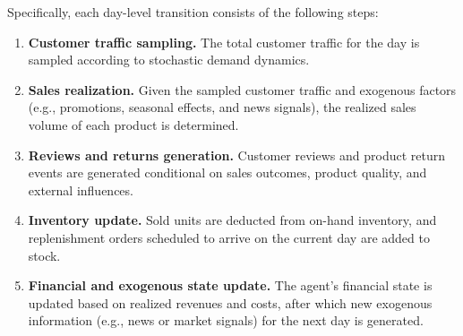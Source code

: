 Specifically, each day-level transition consists of the following steps:
\begin{enumerate}[leftmargin=*]
    \item \textbf{Customer traffic sampling.}  
    The total customer traffic for the day is sampled according to stochastic demand dynamics.
    
    \item \textbf{Sales realization.}  
    Given the sampled customer traffic and exogenous factors (e.g., promotions, seasonal effects, and news signals), the realized sales volume of each product is determined.
    
    \item \textbf{Reviews and returns generation.}  
    Customer reviews and product return events are generated conditional on sales outcomes, product quality, and external influences.
    
    \item \textbf{Inventory update.}  
    Sold units are deducted from on-hand inventory, and replenishment orders scheduled to arrive on the current day are added to stock.
    
    \item \textbf{Financial and exogenous state update.}  
    The agent’s financial state is updated based on realized revenues and costs, after which new exogenous information (e.g., news or market signals) for the next day is generated.
\end{enumerate}


